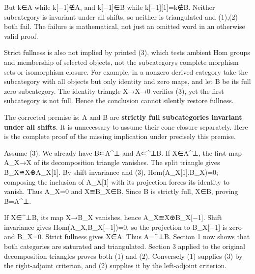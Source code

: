 \documentclass[11pt]{article}
\begin{document}
But k\allowbreak{}∈A while k[−1]\allowbreak{}\allowbreak{}∉A,\allowbreak{} and k[−1]\allowbreak{}\allowbreak{}∈B while k[−1]\allowbreak{}[1]\allowbreak{}\allowbreak{}=k\allowbreak{}∉B. Neither subcategory is invariant under all shifts,\allowbreak{} so neither is triangulated and (1)\allowbreak{},\allowbreak{}(2)\allowbreak{} both fail. The failure is mathematical,\allowbreak{} not just an omitted word in an otherwise valid proof.

Strict fullness is also not implied by printed (3)\allowbreak{},\allowbreak{} which tests ambient Hom groups and membership of selected objects,\allowbreak{} not the subcategory\textquotesingle s complete morphism sets or isomorphism closure. For example,\allowbreak{} in a nonzero derived category take the subcategory with all objects but only identity and zero maps,\allowbreak{} and let B be its full zero subcategory. The identity triangle X\allowbreak{}→X\allowbreak{}→0 verifies (3)\allowbreak{},\allowbreak{} yet the first subcategory is not full. Hence the conclusion cannot silently restore fullness.

The corrected premise is:\allowbreak{} A and B are \textbf{strictly full subcategories invariant under all shifts}. It is unnecessary to assume their cone closure separately. Here is the complete proof of the missing implication under precisely this premise.

Assume (3)\allowbreak{}. We already have B⊂A\^{}⊥ and A⊂\^{}⊥B. If X\allowbreak{}∈A\textasciicircum{}⊥,\allowbreak{} the first map A\_\allowbreak{}X\allowbreak{}→X of its decomposition triangle vanishes. The split triangle gives B\_\allowbreak{}X≅X\allowbreak{}⊕A\_\allowbreak{}X[1]\allowbreak{}. By shift invariance and (3)\allowbreak{},\allowbreak{} Hom(A\_\allowbreak{}X[1]\allowbreak{},\allowbreak{}B\_\allowbreak{}X)\allowbreak{}\allowbreak{}=0; composing the inclusion of A\_\allowbreak{}X[1]\allowbreak{} with its projection forces its identity to vanish. Thus A\_\allowbreak{}X\allowbreak{}=0 and X≅B\_\allowbreak{}X\allowbreak{}∈B. Since B is strictly full,\allowbreak{} X\allowbreak{}∈B,\allowbreak{} proving B\allowbreak{}=A\textasciicircum{}⊥.

If X\allowbreak{}∈\textasciicircum{}⊥B,\allowbreak{} its map X\allowbreak{}→B\_\allowbreak{}X vanishes,\allowbreak{} hence A\_\allowbreak{}X≅X\allowbreak{}⊕B\_\allowbreak{}X[−1]\allowbreak{}. Shift invariance gives Hom(A\_\allowbreak{}X,\allowbreak{}B\_\allowbreak{}X[−1]\allowbreak{})\allowbreak{}\allowbreak{}=0,\allowbreak{} so the projection to B\_\allowbreak{}X[−1]\allowbreak{} is zero and B\_\allowbreak{}X\allowbreak{}=0. Strict fullness gives X\allowbreak{}∈A. Thus A\allowbreak{}=\textasciicircum{}⊥B. Section 1 now shows that both categories are saturated and triangulated. Section 3 applied to the original decomposition triangles proves both (1)\allowbreak{} and (2)\allowbreak{}. Conversely (1)\allowbreak{} supplies (3)\allowbreak{} by the right-adjoint criterion,\allowbreak{} and (2)\allowbreak{} supplies it by the left-adjoint criterion.
\end{document}
